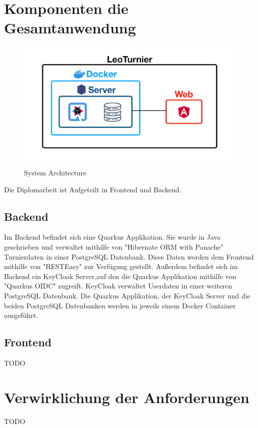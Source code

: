 \section{Komponenten die Gesamtanwendung}

\begin{figure}[H]
    \includegraphics[scale=0.30]{pics/system_architecture.png}
    \caption{System Architecture}
\end{figure}

Die Diplomarbeit ist Aufgeteilt in Frontend und Backend. 

\subsection{Backend}

Im Backend befindet sich eine Quarkus Applikation. Sie wurde in Java geschrieben und verwaltet mithilfe von "Hibernate ORM with Panache" Turnierdaten in einer PostgreSQL Datenbank.
Diese Daten werden dem Frontend mithilfe von "RESTEasy" zur Verfügung gestellt. Außerdem befindet sich im Backend ein KeyCloak Server,auf den die Quarkus Applikation mithilfe von "Quarkus OIDC" zugreift. 
KeyCloak verwaltet Userdaten in einer weiteren PostgreSQL Datenbank. Die Quarkus Applikation, der KeyCloak Server und die beiden PostgreSQL Datenbanken werden in jeweils einem Docker Container ausgeführt.

\subsection{Frontend}

TODO

\section{Verwirklichung der Anforderungen}

TODO